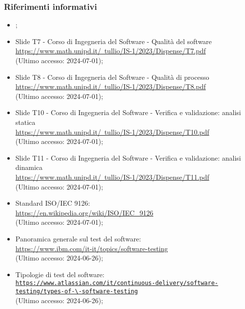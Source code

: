 \subsubsection{Riferimenti informativi}
\begin{itemize}
  \item \AnalisiDeiRequisiti;
  \item Slide T7 - Corso di Ingegneria del Software - Qualità del software \\ \href{https://www.math.unipd.it/~tullio/IS-1/2023/Dispense/T7.pdf}{https://www.math.unipd.it/~tullio/IS-1/2023/Dispense/T7.pdf}  \\ (Ultimo accesso: 2024-07-01);
  \item Slide T8 - Corso di Ingegneria del Software - Qualità di processo \\ \href{https://www.math.unipd.it/~tullio/IS-1/2023/Dispense/T8.pdf}{https://www.math.unipd.it/~tullio/IS-1/2023/Dispense/T8.pdf}  \\ (Ultimo accesso: 2024-07-01);
  \item Slide T10 - Corso di Ingegneria del Software - Verifica e validazione: analisi statica \\ \href{https://www.math.unipd.it/~tullio/IS-1/2023/Dispense/T10.pdf}{https://www.math.unipd.it/~tullio/IS-1/2023/Dispense/T10.pdf}  \\ (Ultimo accesso: 2024-07-01);
  \item Slide T11 - Corso di Ingegneria del Software - Verifica e validazione: analisi dinamica \\ \href{https://www.math.unipd.it/~tullio/IS-1/2023/Dispense/T11.pdf}{https://www.math.unipd.it/~tullio/IS-1/2023/Dispense/T11.pdf}  \\ (Ultimo accesso: 2024-07-01);
  \item Standard ISO/IEC 9126: \\ \href{https://en.wikipedia.org/wiki/ISO/IEC_9126}{https://en.wikipedia.org/wiki/ISO/IEC\_9126}  \\ (Ultimo accesso: 2024-07-01);
  \item Panoramica generale sul test del software: \\ \href{https://www.ibm.com/it-it/topics/software-testing}{https://www.ibm.com/it-it/topics/software-testing}  \\ (Ultimo accesso: 2024-06-26);
  \item Tipologie di test del software: \\ \href{https://www.atlassian.com/it/continuous-delivery/software-testing/types-of-software-testing}{\nolinkurl{https://www.atlassian.com/it/continuous-delivery/software-testing/types-of-\-software-testing}}  \\ (Ultimo accesso: 2024-06-26);

\end{itemize}
